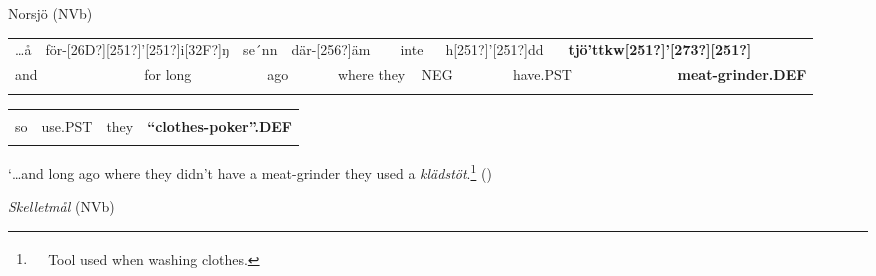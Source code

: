 \begin{listWWNumileveli}
\item {}

\begin{styleExample}
Norsjö (NVb)

\end{styleExample}

\end{listWWNumileveli}

\begin{tabular}{llllllllllllll}
\lsptoprule
…å & \multicolumn{2}{l}{för-[26D?][251?]’[251?]i[32F?]ŋ

} & \multicolumn{2}{l}{se´nn

} & \multicolumn{2}{l}{där-[256?]äm

} & \multicolumn{2}{l}{inte

} & \multicolumn{2}{l}{h[251?]’[251?]dd

} & \multicolumn{2}{l}{{\bfseries tjö’ttkw[251?]’[273?][251?]}

} & \\
\multicolumn{2}{l}{and

} & \multicolumn{2}{l}{for long

} & \multicolumn{2}{l}{ago

} & \multicolumn{2}{l}{where they

} & \multicolumn{2}{l}{NEG

} & \multicolumn{2}{l}{have.PST

} & \multicolumn{2}{l}{{\bfseries meat-grinder.DEF}

}\\
\lspbottomrule
\end{tabular}

\begin{tabular}{llll}
\lsptoprule
\multicolumn{4}{l}{se

}\\
so & use.PST & they & {\bfseries “clothes-poker”.DEF}\\
\lspbottomrule
\end{tabular}

\begin{styleTranslation}
‘…and long ago where they didn’t have a meat-grinder they used a \textit{klädstöt}.\footnote{\textsuperscript{\ \ } Tool used when washing clothes.} (\citet[303]{Westerberg2004})

\end{styleTranslation}

\begin{listWWNumileveli}
\item {}

\begin{styleExample}
\textit{Skelletmål} (NVb)

\end{styleExample}

\end{listWWNumileveli}

